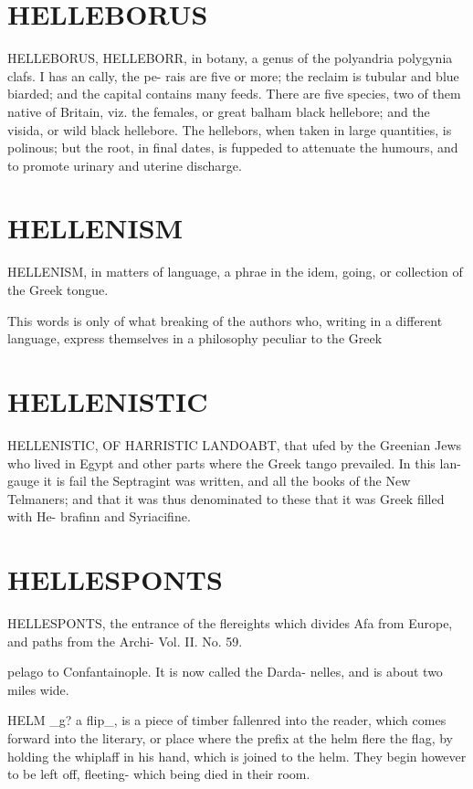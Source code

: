 \documentclass{article}
\begin{document}
\section*{HELLEBORUS}
HELLEBORUS, HELLEBORR, in botany, a genus of the polyandria polygynia clafs. I has an cally, the pe- rais are five or more; the reclaim is tubular and blue biarded; and the capital contains many feeds. There are five species, two of them native of Britain, viz. the females, or great balham black hellebore; and the visida, or wild black hellebore. The hellebors, when taken in large quantities, is polinous; but the root, in final dates, is fuppeded to attenuate the humours, and to promote urinary and uterine discharge.

\section*{HELLENISM}
HELLENISM, in matters of language, a phrae in the idem, going, or collection of the Greek tongue.

This words is only of what breaking of the authors who, writing in a different language, express themselves in a philosophy peculiar to the Greek

\section*{HELLENISTIC}
HELLENISTIC, OF HARRISTIC LANDOABT, that ufed by the Greenian Jews who lived in Egypt and other parts where the Greek tango prevailed. In this lan- gauge it is fail the Septragint was written, and all the books of the New Telmaners; and that it was thus denominated to these that it was Greek filled with He- brafinn and Syriacifine.

\section*{HELLESPONTS}
HELLESPONTS, the entrance of the flereights which divides Afa from Europe, and paths from the Archi- Vol. II. No. 59.

pelago to Confantainople. It is now called the Darda- nelles, and is about two miles wide.

HELM \_g? a flip\_, is a piece of timber fallenred into the reader, which comes forward into the literary, or place where the prefix at the helm flere the flag, by holding the whiplaff in his hand, which is joined to the helm. They begin however to be left off, fleeting- which being died in their room.
\end{document}
